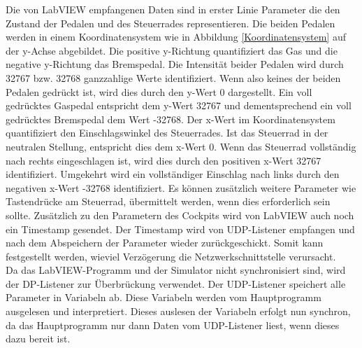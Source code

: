 Die von LabVIEW empfangenen Daten sind in erster Linie Parameter die den Zustand der Pedalen und des Steuerrades representieren. Die beiden Pedalen werden in einem Koordinatensystem wie in Abbildung \ref{Koordinatensystem} auf der y-Achse abgebildet. Die positive y-Richtung quantifiziert das Gas und die negative y-Richtung das Bremspedal. Die Intensität beider Pedalen wird durch 32767 bzw. 32768 ganzzahlige Werte identifiziert. Wenn also keines der beiden Pedalen gedrückt ist, wird dies durch den y-Wert 0 dargestellt. Ein voll gedrücktes Gaspedal entspricht dem y-Wert 32767 und dementsprechend ein voll gedrücktes Bremspedal dem Wert -32768. Der x-Wert im Koordinatensystem quantifiziert den Einschlagswinkel des Steuerrades. Ist das Steuerrad in der neutralen Stellung, entspricht dies dem x-Wert 0. Wenn das Steuerrad vollständig nach rechts eingeschlagen ist, wird dies durch den positiven x-Wert 32767 identifiziert. Umgekehrt wird ein vollständiger Einschlag nach links durch den negativen x-Wert -32768 identifiziert. Es können zusätzlich weitere Parameter wie Tastendrücke am Steuerrad, übermittelt werden, wenn dies erforderlich sein sollte. Zusätzlich zu den Parametern des Cockpits wird von LabVIEW auch noch ein Timestamp gesendet. Der Timestamp wird von UDP-Listener empfangen und nach dem Abspeichern der Parameter wieder zurückgeschickt. Somit kann festgestellt werden, wieviel Verzögerung die Netzwerkschnittstelle verursacht. \\
Da das LabVIEW-Programm und der Simulator nicht synchronisiert sind, wird der DP-Listener zur Überbrückung verwendet. Der UDP-Listener speichert alle Parameter in Variabeln ab. Diese Variabeln werden vom Hauptprogramm ausgelesen und interpretiert. Dieses auslesen der Variabeln erfolgt nun synchron, da das Hauptprogramm nur dann Daten vom UDP-Listener liest, wenn dieses dazu bereit ist.

